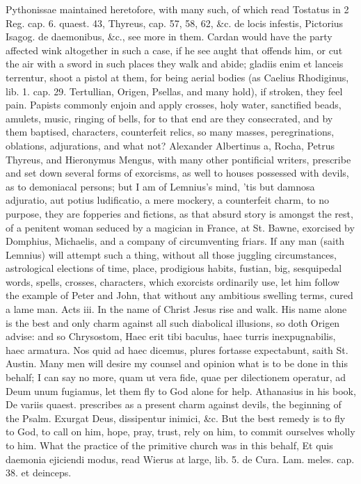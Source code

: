 {Pythonissae maintained heretofore, with many such, of which read
Tostatus in 2 Reg. cap. 6. quaest. 43, Thyreus, cap. 57, 58, 62, \&c. de
locis infestis, Pictorius Isagog. de daemonibus, \&c., see more in them.
Cardan would have the party affected wink altogether in such a case, if
he see aught that offends him, or cut the air with a sword in such
places they walk and abide; gladiis enim et lanceis terrentur, shoot a
pistol at them, for being aerial bodies (as Caelius Rhodiginus, lib. 1.
cap. 29. Tertullian, Origen, Psellas, and many hold), if stroken, they
feel pain. Papists commonly enjoin and apply crosses, holy water,
sanctified beads, amulets, music, ringing of bells, for to that end are
they consecrated, and by them baptised, characters, counterfeit relics,
so many masses, peregrinations, oblations, adjurations, and what not?
Alexander Albertinus a, Rocha, Petrus Thyreus, and Hieronymus Mengus,
with many other pontificial writers, prescribe and set down several
forms of exorcisms, as well to houses possessed with devils, as to
demoniacal persons; but I am of Lemnius's mind, 'tis but damnosa
adjuratio, aut potius ludificatio, a mere mockery, a counterfeit charm,
to no purpose, they are fopperies and fictions, as that absurd
story is amongst the rest, of a penitent woman seduced by a
magician in France, at St. Bawne, exorcised by Domphius, Michaelis, and
a company of circumventing friars. If any man (saith Lemnius) will
attempt such a thing, without all those juggling circumstances,
astrological elections of time, place, prodigious habits, fustian, big,
sesquipedal words, spells, crosses, characters, which exorcists
ordinarily use, let him follow the example of Peter and John, that
without any ambitious swelling terms, cured a lame man. Acts iii. In
the name of Christ Jesus rise and walk. His name alone is the best and
only charm against all such diabolical illusions, so doth Origen
advise: and so Chrysostom, Haec erit tibi baculus, haec turris
inexpugnabilis, haec armatura. Nos quid ad haec dicemus, plures
fortasse expectabunt, saith St. Austin. Many men will desire my counsel
and opinion what is to be done in this behalf; I can say no more, quam
ut vera fide, quae per dilectionem operatur, ad Deum unum fugiamus, let
them fly to God alone for help. Athanasius in his book, De variis
quaest. prescribes as a present charm against devils, the beginning of
the  Psalm. Exurgat Deus, dissipentur inimici, \&c. But the best
remedy is to fly to God, to call on him, hope, pray, trust, rely on
him, to commit ourselves wholly to him. What the practice of the
primitive church was in this behalf, Et quis daemonia ejiciendi modus,
read Wierus at large, lib. 5. de Cura. Lam. meles. cap. 38. et
deinceps.

}
